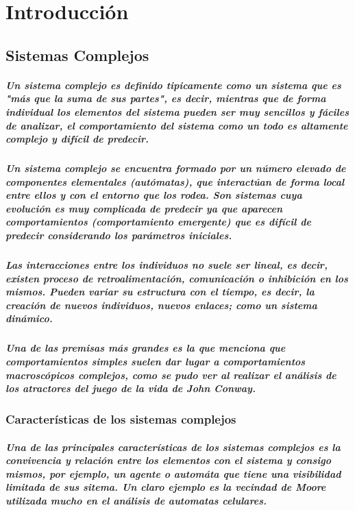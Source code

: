 %
\newpage
\chapter{Introducción}
  \section{Sistemas Complejos}
      \paragraph{Un sistema complejo es definido tipicamente como un sistema que es "más que la suma de sus partes", es decir, mientras que de forma individual los elementos del sistema pueden ser muy sencillos y fáciles de analizar, el comportamiento del sistema como un todo es altamente complejo y difícil de predecir.\cite{3}}
      \paragraph{Un sistema complejo se encuentra formado por un número elevado de componentes elementales (autómatas), que interactúan de forma local entre ellos y con el entorno que los rodea. Son sistemas cuya evolución es muy complicada de predecir ya que aparecen comportamientos (comportamiento emergente) que es difícil de predecir considerando los parámetros iniciales.}
      \paragraph{Las interacciones entre los individuos no suele ser lineal, es decir, existen proceso de retroalimentación, comunicación o inhibición en los mismos. Pueden variar su estructura con el tiempo, es decir, la creación de nuevos individuos, nuevos enlaces; como un sistema dinámico. \cite{1}}
      \paragraph{Una de las premisas más grandes es la que menciona que comportamientos simples suelen dar lugar a comportamientos macroscópicos complejos, como se pudo ver al realizar el análisis de los atractores del juego de la vida de John Conway.\cite{2}}
    \subsection{Características de los sistemas complejos}
      \paragraph{Una de las principales características de los sistemas complejos es la convivencia y relación entre los elementos con el sistema y consigo mismos, por ejemplo, un agente o automáta que tiene una visibilidad limitada de sus sitema. Un claro ejemplo es la vecindad de Moore utilizada mucho en el análisis de automatas celulares.\cite{4}}
